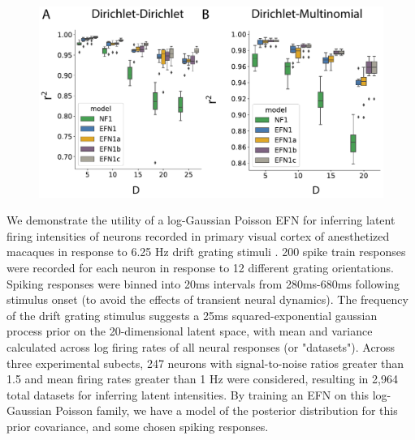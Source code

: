 \documentclass{article}
\begin{document}
\begin{figure}
\centering
\includegraphics[width=1.0\linewidth]{figs/fig4/fig4.pdf}
\label{fig:test1}
\end{figure}
We demonstrate the utility of a log-Gaussian Poisson EFN for inferring latent firing intensities of neurons recorded in primary visual cortex of anesthetized macaques in response to 6.25 Hz drift grating stimuli \citep{smith2008spatial}.  200 spike train responses were recorded for each neuron in response to 12 different grating orientations.  Spiking responses were binned into 20ms intervals from 280ms-680ms following stimulus onset (to avoid the effects of transient neural dynamics).  The frequency of the drift grating stimulus suggests a 25ms squared-exponential gaussian process prior on the 20-dimensional latent space, with mean and variance calculated across log firing rates of all neural responses (or "datasets").  Across three experimental subects, 247 neurons with signal-to-noise ratios greater than 1.5 and mean firing rates greater than 1 Hz were considered, resulting in 2,964 total datasets for inferring latent intensities.  By training an EFN on this log-Gaussian Poisson family, we have a model of the posterior distribution for this prior covariance, and some chosen spiking responses.   
\end{document}
